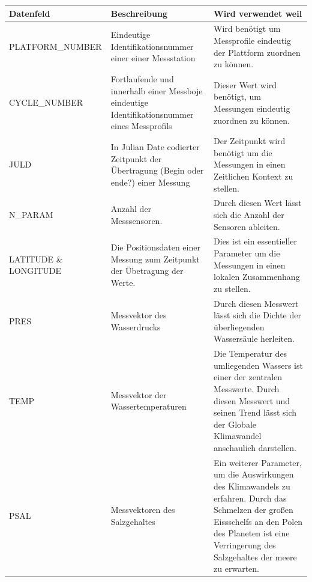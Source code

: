 \begin{center}
    \begin{tabular}{ | l | p{4cm} |p{6cm} |}
    \hline
    \textbf{Datenfeld} & \textbf{Beschreibung} & \textbf{Wird verwendet weil} \\\hline
   
    PLATFORM\_NUMBER 
        & Eindeutige Identifikationsnummer einer einer Messstation
        & Wird benötigt um Messprofile eindeutig der Plattform zuordnen zu können. \\\hline 
    
    CYCLE\_NUMBER 
        & Fortlaufende und innerhalb einer Messboje eindeutige Identifikationsnummer eines Messprofils
        & Dieser Wert wird benötigt, um Messungen eindeutig zuordnen zu können. \\\hline
    
    JULD
        & In Julian Date codierter Zeitpunkt der Übertragung (Begin oder ende?) einer Messung
        & Der Zeitpunkt wird benötigt um die Messungen in einen Zeitlichen Kontext zu stellen. \\\hline
        
    N\_PARAM
        & Anzahl der Messsensoren. 
        & Durch diesen Wert lässt sich die Anzahl der Sensoren ableiten. \\\hline
        
    LATITUDE \& LONGITUDE
        & Die Positionsdaten einer Messung zum Zeitpunkt der Übetragung der Werte.
        & Dies ist ein essentieller Parameter um die Messungen in einen lokalen Zusammenhang zu stellen. \\\hline
        
    PRES
        & Messvektor des Wasserdrucks
        & Durch diesen Messwert lässt sich die Dichte der überliegenden Wassersäule herleiten. \\\hline
        
    TEMP
        & Messvektor der Wassertemperaturen 
        &  Die Temperatur des umliegenden Wassers ist einer der zentralen Messwerte. Durch diesen Messwert und seinen Trend lässt sich der Globale Klimawandel anschaulich darstellen.  \\\hline
        
    PSAL
        & Messvektoren des Salzgehaltes
        & Ein weiterer Parameter, um die Auswirkungen des Klimawandels zu erfahren. Durch das Schmelzen der großen Eissschelfs an den Polen des Planeten ist eine Verringerung des Salzgehaltes der meere zu erwarten. \\\hline
    \end{tabular}
\end{center}

